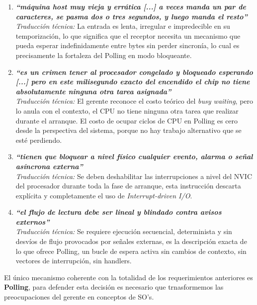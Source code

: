 \documentclass[12pt,letterpaper]{article}
\begin{document}
\begin{enumerate}[leftmargin=*, label=\textbf{\arabic*.}]
\item \textit{\textbf{``máquina host muy vieja y errática [...] a veces manda un par de caracteres, se pasma dos o tres segundos, y luego manda el resto''}}\\
  
  \textit{Traducción técnica:} La entrada es lenta, irregular e impredecible en su temporización, lo que
  significa que el receptor necesita un mecanismo que pueda esperar indefinidamente entre bytes sin perder
  sincronía, lo cual es precisamente la fortaleza del Polling en modo bloqueante.
  
\item \textit{\textbf{``es un crimen tener al procesador congelado y bloqueado esperando [...] pero en este milisegundo exacto del encendido el chip no tiene absolutamente ninguna otra tarea asignada''}}\\
  
  \textit{Traducción técnica:} El gerente reconoce el costo teórico del \textit{busy waiting}, pero lo anula con
  el contexto, el CPU no tiene ninguna otra tarea que realizar durante el arranque. El costo de ocupar ciclos de
  CPU en Polling es cero desde la perspectiva del sistema, porque no hay trabajo alternativo que se esté
  perdiendo.
  
\item \textit{\textbf{``tienen que bloquear a nivel físico cualquier evento, alarma o señal asíncrona externa''}}\\
  
  \textit{Traducción técnica:} Se deben deshabilitar las interrupciones a nivel del NVIC del procesador durante
  toda la fase de arranque, esta instrucción descarta explícita y completamente el uso de
  \textit{Interrupt-driven I/O}.
  
\item \textit{\textbf{``el flujo de lectura debe ser lineal y blindado contra avisos externos''}}\\
  
  \textit{Traducción técnica:} Se requiere ejecución secuencial, determinista y sin desvíos de flujo provocados
  por señales externas, es la descripción exacta de lo que ofrece Polling, un bucle de espera activa sin cambios
  de contexto, sin vectores de interrupción, sin handlers.  
\end{enumerate}

El único mecanismo coherente con la totalidad de los requerimientos anteriores es \textbf{Polling}, para defender
esta decisión es necesario que trnasformemos las preocupaciones del gerente en conceptos de SO's.\\
\end{document}
